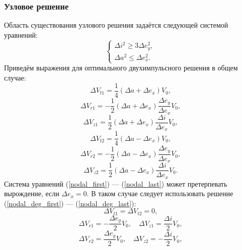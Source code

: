 \documentclass[12pt,a4paper]{extarticle}
\begin{document}
\subsubsection{Узловое решение}
Область существования узлового решения задаётся следующей системой уравнений:
\begin{equation}
\begin{cases}
    \Delta i^2 \geq 3\Delta e_y^2, \\
    \Delta a^2 \leq \Delta e_x^2.
\end{cases}
\end{equation}
Приведём выражения для оптимального двухимпульсного решения в общем случае:
\begin{equation}
    \Delta V_{t1} = \frac{1}{4} (\Delta a + \Delta e_x) V_0,
\label{nodal_first}
\end{equation}
\begin{equation}
    \Delta V_{r1} = -\frac{1}{2} (\Delta a + \Delta e_x) \frac{\Delta e_y}{\Delta e_x} V_0,
\end{equation}
\begin{equation}
    \Delta V_{z1} = \frac{1}{2} (\Delta a + \Delta e_x) \frac{\Delta i}{\Delta e_x} V_0,
\end{equation}
\begin{equation}
    \Delta V_{t2} = \frac{1}{4} (\Delta a - \Delta e_x) V_0,
\end{equation}
\begin{equation}
    \Delta V_{r2} = -\frac{1}{2} (\Delta a - \Delta e_x) \frac{\Delta e_y}{\Delta e_x} V_0,
\end{equation}
\begin{equation}
    \Delta V_{z2} = \frac{1}{2} (\Delta a - \Delta e_x) \frac{\Delta i}{\Delta e_x} V_0.
\label{nodal_last}
\end{equation}
Система уравнений (\ref{nodal_first}) --- (\ref{nodal_last}) может претерпевать вырождение, если $\Delta e_x = 0$. В таком случае следует использовать решение (\ref{nodal_deg_first}) --- (\ref{nodal_deg_last}):
\begin{equation}
    \Delta V_{t1} = \Delta V_{t2} = 0,
\label{nodal_deg_first}
\end{equation}
\begin{equation}
    \Delta V_{r1} = - \frac{\Delta e_y}{2} V_0, \quad \Delta V_{z1} = \frac{\Delta i}{2} V_0,
\end{equation}
\begin{equation}
    \Delta V_{r2} = \frac{\Delta e_y}{2} V_0, \quad \Delta V_{z2} = - \frac{\Delta i}{2} V_0,
\label{nodal_deg_last}
\end{equation}
\end{document}
